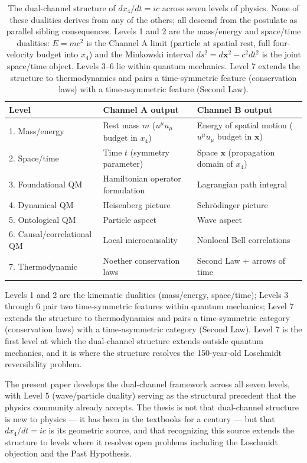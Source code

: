 \documentclass[11pt,a4paper]{article}
\begin{document}
\begin{table}[h]
\centering
\begin{tabular}{lll}
\hline
\textbf{Level} & \textbf{Channel A output} & \textbf{Channel B output} \\
\hline
1. Mass/energy & Rest mass $m$ ($u^\mu u_\mu$ budget in $x_4$) & Energy of spatial motion ($u^\mu u_\mu$ budget in $\mathbf{x}$) \\
2. Space/time & Time $t$ (symmetry parameter) & Space $\mathbf{x}$ (propagation domain of $x_4$) \\
3. Foundational QM & Hamiltonian operator formulation & Lagrangian path integral \\
4. Dynamical QM & Heisenberg picture & Schr\"odinger picture \\
5. Ontological QM & Particle aspect & Wave aspect \\
6. Causal/correlational QM & Local microcausality & Nonlocal Bell correlations \\
7. Thermodynamic & Noether conservation laws & Second Law + arrows of time \\
\hline
\end{tabular}
\caption{The dual-channel structure of $dx_4/dt = ic$ across seven levels of physics. None of these dualities derives from any of the others; all descend from the postulate as parallel sibling consequences. Levels 1 and 2 are the mass/energy and space/time dualities: $E = mc^2$ is the Channel A limit (particle at spatial rest, full four-velocity budget into $x_4$) and the Minkowski interval $ds^2 = d\mathbf{x}^2 - c^2 dt^2$ is the joint space/time object. Levels 3--6 lie within quantum mechanics. Level 7 extends the structure to thermodynamics and pairs a time-symmetric feature (conservation laws) with a time-asymmetric feature (Second Law).}
\label{tab:sevenlevels}
\end{table}

Levels 1 and 2 are the kinematic dualities (mass/energy, space/time); Levels 3 through 6 pair two time-symmetric features within quantum mechanics; Level 7 extends the structure to thermodynamics and pairs a time-symmetric category (conservation laws) with a time-asymmetric category (Second Law). Level 7 is the first level at which the dual-channel structure extends outside quantum mechanics, and it is where the structure resolves the 150-year-old Loschmidt reversibility problem.

The present paper develops the dual-channel framework across all seven levels, with Level 5 (wave/particle duality) serving as the structural precedent that the physics community already accepts. The thesis is not that dual-channel structure is new to physics --- it has been in the textbooks for a century --- but that $dx_4/dt = ic$ is its geometric source, and that recognizing this source extends the structure to levels where it resolves open problems including the Loschmidt objection and the Past Hypothesis.
\end{document}
